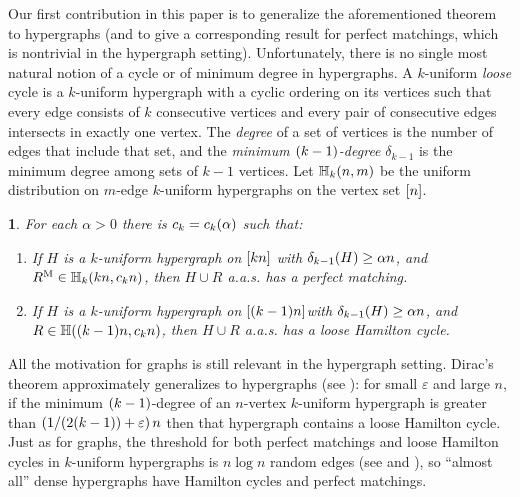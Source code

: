 \documentclass[11pt,english]{article}
\theoremstyle{plain}
\newtheorem{thm}{\protect\theoremname}
\theoremstyle{definition}
\theoremstyle{definition}
\theoremstyle{plain}
\theoremstyle{plain}
\theoremstyle{plain}
\theoremstyle{plain}
\theoremstyle{remark}
\theoremstyle{remark}
\let\originalleft\left
\let\originalright\right
\renewcommand{\left}{\mathopen{}\mathclose\bgroup\originalleft}
\renewcommand{\right}{\aftergroup\egroup\originalright}
\providecommand{\theoremname}{Theorem}
\begin{document}
Our first contribution in this paper is to generalize the aforementioned
theorem to hypergraphs (and to give a corresponding result for perfect
matchings, which is nontrivial in the hypergraph setting). Unfortunately,
there is no single most natural notion of a cycle or of minimum degree
in hypergraphs. A $k$-uniform \emph{loose} cycle is a $k$-uniform
hypergraph with a cyclic ordering on its vertices such that every
edge consists of $k$ consecutive vertices and every pair of consecutive
edges intersects in exactly one vertex. The \emph{degree} of a set of vertices
is the number of edges that include that set, and the \emph{minimum
$\left(k-1\right)$-degree }$\delta_{k-1}$ is the minimum degree
among sets of $k-1$ vertices. Let $\HH_{k}\left(n,m\right)$ be
the uniform distribution on $m$-edge $k$-uniform hypergraphs on
the vertex set $\range n$.
\begin{thm}
\label{thm:hypergraph-theorems}For each $\alpha>0$ there is $\chyp=\chyp\left(\alpha\right)$ such that:

\begin{enumerate}[topsep=0px,label=(\alph*)]

\item{\label{itm:hypergraph-matching-theorem}If $H$ is
a $k$-uniform hypergraph on $\range{kn}$ with $\delta_{k-1}\left(H\right)\ge\alpha n$,
and $R^{\mathrm{M}}\in\HH_{k}\left(kn,\chypmat n\right)$, then
$H\cup R$ a.a.s.{} has a perfect matching.}

\item{\label{itm:hypergraph-cycle-theorem}If $H$ is
a $k$-uniform hypergraph on $\range{\left(k-1\right)n}$with
$\delta_{k-1}\left(H\right)\ge\alpha n$, and $R\in\HH\left(\left(k-1\right)n,\chypham n\right)$,
then $H\cup R$ a.a.s.{} has a loose Hamilton cycle.}

\end{enumerate}
\end{thm}
All the motivation for graphs is still relevant in the hypergraph setting. Dirac's theorem approximately generalizes to hypergraphs (see \cite{KKMO11}): for small $\varepsilon$ and large $n$, if the minimum $\left(k-1\right)$-degree of an $n$-vertex $k$-uniform hypergraph is greater than $\left(1/\left(2\left(k-1\right)\right)+\varepsilon\right)\,n$ then that hypergraph contains a loose Hamilton cycle. Just as for graphs, the threshold for both perfect matchings and loose Hamilton cycles in $k$-uniform hypergraphs is $n\log n$ random
edges (see \cite{DF11} and \cite[Corollary~2.6]{JKV08}), so ``almost
all'' dense hypergraphs have Hamilton cycles and perfect matchings.
\end{document}
